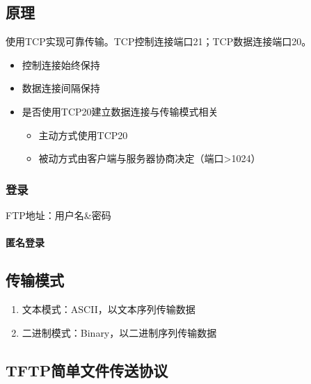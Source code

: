 \subsection{原理}

使用TCP实现可靠传输。TCP控制连接端口21；TCP数据连接端口20。
\begin{itemize}
    \item 控制连接始终保持
    \item 数据连接间隔保持
    \item 是否使用TCP20建立数据连接与传输模式相关\begin{itemize}
        \item 主动方式使用TCP20
        \item 被动方式由客户端与服务器协商决定（端口>1024）
    \end{itemize}
\end{itemize}

\subsubsection{登录}
FTP地址：用户名\&密码

\paragraph{匿名登录}


\subsection{传输模式}
\begin{enumerate}
    \item 文本模式：ASCII，以文本序列传输数据
    \item 二进制模式：Binary，以二进制序列传输数据
\end{enumerate}


\subsection{TFTP简单文件传送协议}


